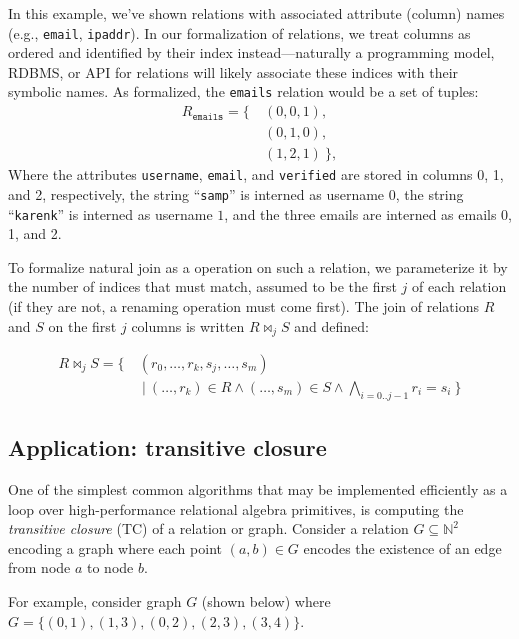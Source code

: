 In this example, we've shown relations with associated attribute (column) names (e.g., \texttt{email}, \texttt{ipaddr}). In our formalization of relations, we treat columns as ordered and identified by their index instead---naturally a programming model, RDBMS, or API for relations will likely associate these indices with their symbolic names. As formalized, the \texttt{emails} relation would be a set of tuples:
%
\begin{align*}
  R_\texttt{emails} = \{
  &
  \ (0,0,1),
  \\
  &\ (0,1,0),
  \\
  &\ (1,2,1)\ \},
\end{align*}
%
Where the attributes \texttt{username}, \texttt{email}, and \texttt{verified} are stored in columns 0, 1, and 2, respectively, the string ``\texttt{samp}'' is interned as username $0$, the string ``\texttt{karenk}'' is interned as username $1$, and the three emails are interned as emails 0, 1, and 2.  

To formalize natural join as a operation on such a relation, we parameterize it by the number of indices that must match, assumed to be the first $j$ of each relation (if they are not, a renaming operation must come first). The join of relations $R$ and $S$ on the first $j$ columns is written $R \bowtie_j S$ and defined:

\begin{align*}
  R \bowtie_j S = \{\ & (r_0,\ldots,r_k,s_j,\ldots,s_m)\
  \\
  &\ \vert\ (\ldots,r_k) \in R \wedge (\ldots,s_m) \in S \wedge \!\!\!\!\bigwedge_{i=0..{j-1}}\!\!\!\! r_i = s_i \ \}
\end{align*}

\subsection{Application: transitive closure}
\label{sec:ra:tc}
%
One of the simplest common algorithms that may be implemented efficiently as a loop over high-performance relational algebra primitives, is computing the \emph{transitive closure} (TC) of a relation or graph. Consider a relation $G \subseteq \mathbb{N}^2$ encoding a graph where each point $(a,b) \in G$ encodes the existence of an edge from node $a$ to node $b$.

For example, consider graph $G$ (shown below) where \newline$G = \{(0,1), (1,3), (0,2), (2,3), (3,4)\}$. 

\begin{center}
\end{center}

